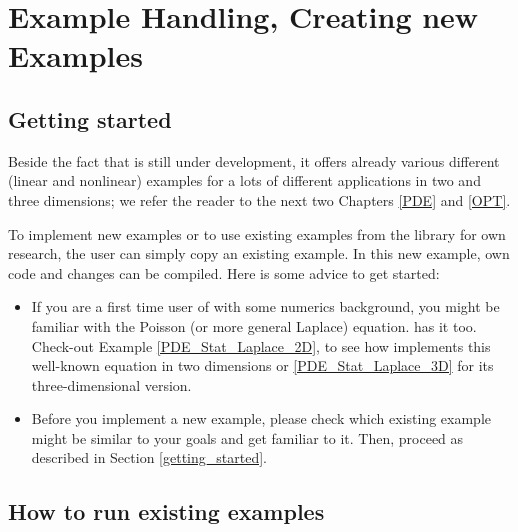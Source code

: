 \chapter{Example Handling, Creating new Examples}
\label{chap:howtoex}
\section{Getting started}
Beside the fact that \dope{} is still under development,
it offers already various different (linear and nonlinear) 
examples for a lots 
of different applications in two and three dimensions; 
we refer the reader to the 
next two Chapters \ref{PDE} and \ref{OPT}. 

To implement new examples or to use existing examples 
from the library for own research, the user 
can simply copy an existing example. In this 
new example, own code and changes can be compiled. Here is some 
advice to get started:
\begin{itemize}
\item If you are a first time user of \dope{} 
with some numerics background, you 
might be familiar with the Poisson (or more general Laplace) equation.
\dope{} has it too. Check-out Example \ref{PDE_Stat_Laplace_2D},
to see how \dope{} implements this well-known equation in two
dimensions or \ref{PDE_Stat_Laplace_3D} for its three-dimensional version.
\item Before you implement a new example, please check which 
existing example might be similar to your goals and get familiar 
to it. Then, proceed as described in Section \ref{getting_started}. 
\end{itemize}

\section{How to run existing examples}
